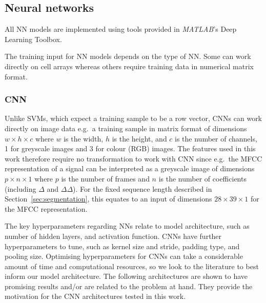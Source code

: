 \subsection{Neural networks}

All NN models are implemented using tools provided in \textit{MATLAB}'s Deep
Learning Toolbox.

The training input for NN models depends on the type of NN\@. Some can work
directly on cell arrays whereas others require training data in numerical matrix
format.

\subsubsection{CNN}\label{sssec:method:cnn}

Unlike SVMs, which expect a training sample to be a row vector, CNNs can work
directly on image data e.g.\ a training sample in matrix format of dimensions
$w \times h \times c$ where $w$ is the width, $h$ is the height, and $c$ is the
number of channels, 1 for greyscale images and 3 for colour (RGB) images. The
features used in this work therefore require no transformation to work with CNN
since e.g.\ the MFCC representation of a signal can be interpreted as a
greyscale image of dimensions $p \times n \times 1$ where $p$ is the number of
frames and $n$ is the number of coefficients (including $\Delta$ and
$\Delta\Delta$). For the fixed sequence length described in
Section~\ref{sec:segmentation}, this equates to an input of dimensions $28
\times 39 \times 1$ for the MFCC representation.

The key hyperparameters regarding NNs relate to model architecture, such as
number of hidden layers, and activation function. CNNs have further
hyperparameters to tune, such as kernel size and stride, padding type, and
pooling size. Optimising hyperparameters for CNNs can take a
considerable amount of time and computational resources, so we look to the
literature to best inform our model architecture. The following architectures are
shown to have promising results and/or are related to the problem at hand. They
provide the motivation for the CNN architectures tested in this work.

